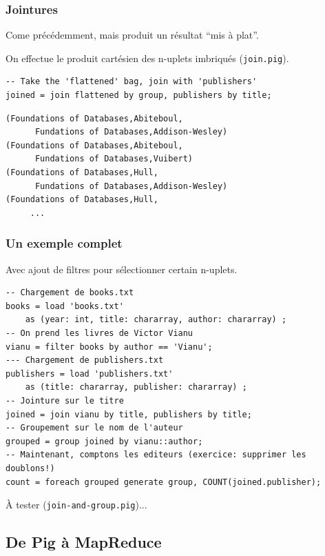 \begin{frame}[fragile]
\frametitle{Jointures}
\vfill
Come précédemment, mais produit un résultat ``mis à plat''. 

\vfill

On
effectue le produit cartésien des n-uplets imbriqués (\texttt{join.pig}).

\vfill

\begin{lstlisting}[language=pig]
-- Take the 'flattened' bag, join with 'publishers'
joined = join flattened by group, publishers by title;
\end{lstlisting}

\vfill

{\small\begin{verbatim}
(Foundations of Databases,Abiteboul,
      Fundations of Databases,Addison-Wesley)
(Foundations of Databases,Abiteboul,
      Fundations of Databases,Vuibert)
(Foundations of Databases,Hull,
      Fundations of Databases,Addison-Wesley)
(Foundations of Databases,Hull,
     ...
\end{verbatim}
}

\end{frame}


\begin{frame}[fragile]
\frametitle{Un exemple complet}
\vfill
Avec ajout de filtres pour sélectionner certain n-uplets.


\vfill

\begin{lstlisting}[language=pig]
-- Chargement de books.txt
books = load 'books.txt' 
    as (year: int, title: chararray, author: chararray) ;
-- On prend les livres de Victor Vianu
vianu = filter books by author == 'Vianu';
--- Chargement de publishers.txt
publishers = load 'publishers.txt' 
    as (title: chararray, publisher: chararray) ;
-- Jointure sur le titre
joined = join vianu by title, publishers by title;
-- Groupement sur le nom de l'auteur
grouped = group joined by vianu::author;
-- Maintenant, comptons les editeurs (exercice: supprimer les doublons!)
count = foreach grouped generate group, COUNT(joined.publisher);
\end{lstlisting}

À tester (\texttt{join-and-group.pig})...

\end{frame}


\subsection{De Pig à MapReduce}


